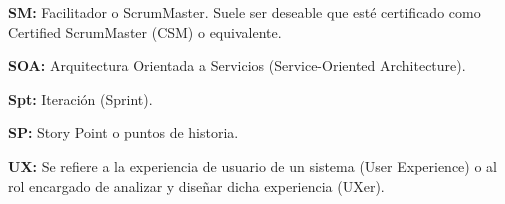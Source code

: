 \begin{description}
  \item {\textbf{SM:} Facilitador o ScrumMaster. Suele ser deseable que esté certificado como Certified ScrumMaster (CSM) o equivalente. }
  
  \item {\textbf{SOA:} Arquitectura Orientada a Servicios (Service-Oriented Architecture).}
  
  \item {\textbf{Spt:} Iteración (Sprint).}
  
  \item {\textbf{SP:} Story Point o puntos de historia.}
  
  \item {\textbf{UX:} Se refiere a la experiencia de usuario de un sistema (User Experience) o al rol encargado de analizar y diseñar dicha experiencia (UXer).}
  
\end{description}
  

